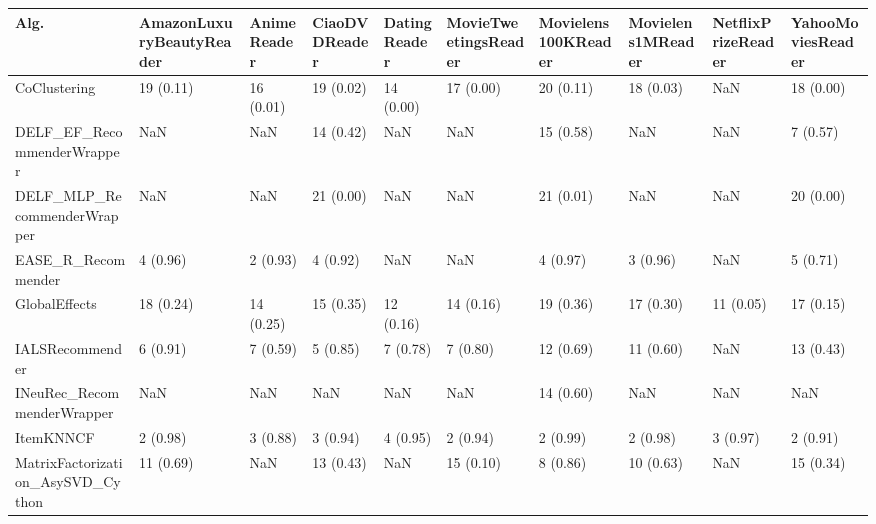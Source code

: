 \begin{tabular}{llllllllll}
\toprule
                               Alg. & AmazonLuxuryBeautyReader & AnimeReader & CiaoDVDReader & DatingReader & MovieTweetingsReader & Movielens100KReader & Movielens1MReader & NetflixPrizeReader & YahooMoviesReader \\
\midrule
                       CoClustering &                19 (0.11) &   16 (0.01) &     19 (0.02) &    14 (0.00) &            17 (0.00) &           20 (0.11) &         18 (0.03) &                NaN &         18 (0.00) \\
         DELF\_EF\_RecommenderWrapper &                      NaN &         NaN &     14 (0.42) &          NaN &                  NaN &           15 (0.58) &               NaN &                NaN &          7 (0.57) \\
        DELF\_MLP\_RecommenderWrapper &                      NaN &         NaN &     21 (0.00) &          NaN &                  NaN &           21 (0.01) &               NaN &                NaN &         20 (0.00) \\
                 EASE\_R\_Recommender &                 4 (0.96) &    2 (0.93) &      4 (0.92) &          NaN &                  NaN &            4 (0.97) &          3 (0.96) &                NaN &          5 (0.71) \\
                      GlobalEffects &                18 (0.24) &   14 (0.25) &     15 (0.35) &    12 (0.16) &            14 (0.16) &           19 (0.36) &         17 (0.30) &          11 (0.05) &         17 (0.15) \\
                    IALSRecommender &                 6 (0.91) &    7 (0.59) &      5 (0.85) &     7 (0.78) &             7 (0.80) &           12 (0.69) &         11 (0.60) &                NaN &         13 (0.43) \\
         INeuRec\_RecommenderWrapper &                      NaN &         NaN &           NaN &          NaN &                  NaN &           14 (0.60) &               NaN &                NaN &               NaN \\
                          ItemKNNCF &                 2 (0.98) &    3 (0.88) &      3 (0.94) &     4 (0.95) &             2 (0.94) &            2 (0.99) &          2 (0.98) &           3 (0.97) &          2 (0.91) \\
  MatrixFactorization\_AsySVD\_Cython &                11 (0.69) &         NaN &     13 (0.43) &          NaN &            15 (0.10) &            8 (0.86) &         10 (0.63) &                NaN &         15 (0.34) \\

\end{tabular}
